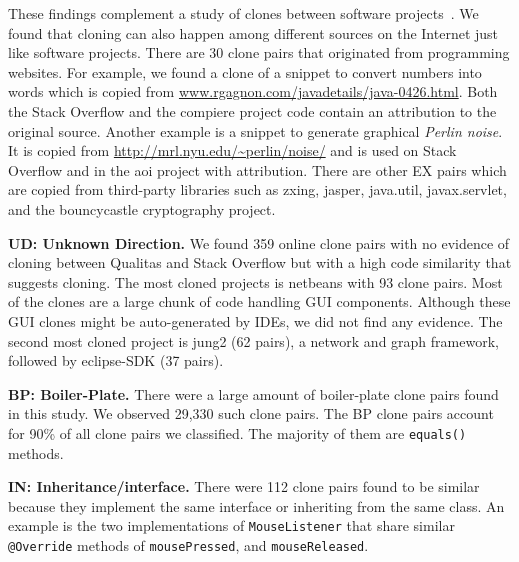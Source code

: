 \documentclass[sigconf,review, anonymous]{acmart}
\begin{document}
These findings complement a study of clones between software
projects~\cite{Svajlenko2014}. We found that cloning can also
happen among different sources on the Internet just like software
projects. There are 30 clone pairs that originated from programming
websites. For example, we found a clone of a snippet to convert
numbers into words which is copied from
\url{www.rgagnon.com/javadetails/java-0426.html}. Both the Stack
Overflow and the \textsf{compiere} project code contain an
attribution to the original source. Another example is a snippet
to generate graphical \textit{Perlin noise}. It is copied from
\url{http://mrl.nyu.edu/~perlin/noise/} and is used on Stack
Overflow and in the \textsf{aoi} project with
attribution.
There are other EX pairs which are copied from third-party
libraries such as \textsf{zxing}, \textsf{jasper}, \textsf{java.util},
\textsf{javax.servlet}, and the \textsf{bouncycastle} cryptography
project.

\textbf{UD: Unknown Direction.} We found 359 online clone pairs with
no evidence of cloning between Qualitas and Stack Overflow but with a
high code similarity that suggests cloning. 
The most cloned projects is \textsf{netbeans} with
93 clone pairs. Most of the clones are a large chunk of code handling
GUI components. Although these GUI clones might be auto-generated by
IDEs, we did not find any evidence. The second most cloned project is
\textsf{jung2} (62 pairs), a network and graph framework, followed by
\textsf{eclipse-SDK} (37 pairs).

\textbf{BP: Boiler-Plate.} There were a large amount of boiler-plate
clone pairs found in this study. %
We observed 29,330 such clone pairs. The BP clone pairs account for
90\% of all clone pairs we classified. The majority of them are
{\small{\texttt{equals()}}} methods.

\textbf{IN: Inheritance/interface.} There were 112 clone pairs found
to be similar because they implement the same interface or inheriting
from the same class. An example is the two implementations of
{\small{\texttt{MouseListener}}} that share similar
{\small\texttt{@Override}} methods of {\small\texttt{mousePressed}},
and {\small\texttt{mouseReleased}}.
\end{document}
